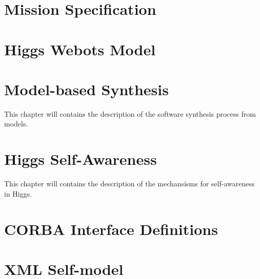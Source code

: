 \documentclass{aslreport}
\begin{document}
\chapter{Mission Specification}

\chapter{Higgs Webots Model}



\chapter{Model-based Synthesis}

This chapter will contains the description of the software synthesis process
from models.

\chapter{Higgs Self-Awareness}

This chapter will contains the description of the mechansisms for self-awareness
in Higgs.

\appendix
\chapter{CORBA Interface Definitions}


\chapter{XML Self-model}
\end{document}
